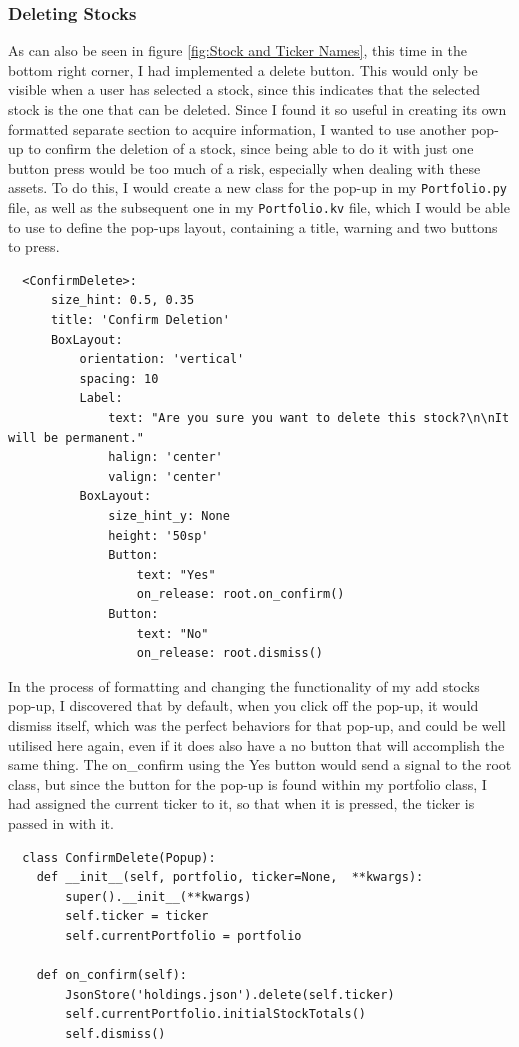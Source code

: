 \documentclass{article}
\begin{document}
\subsubsection{Deleting Stocks}
As can also be seen in figure \ref{fig:Stock and Ticker Names}, this time in the bottom right corner, I had implemented a delete button. This would only be visible when a user has selected a stock, since this indicates that the selected stock is the one that can be deleted. Since I found it so useful in creating its own formatted separate section to acquire information, I wanted to use another pop-up to confirm the deletion of a stock, since being able to do it with just one button press would be too much of a risk, especially when dealing with these assets. To do this, I would create a new class for the pop-up in my \texttt{Portfolio.py} file, as well as the subsequent one in my \texttt{Portfolio.kv} file, which I would be able to use to define the pop-ups layout, containing a title, warning and two buttons to press.\\\vspace{0.3cm}

\begin{verbatim}
  <ConfirmDelete>:
      size_hint: 0.5, 0.35
      title: 'Confirm Deletion'
      BoxLayout:
          orientation: 'vertical'
          spacing: 10
          Label:
              text: "Are you sure you want to delete this stock?\n\nIt will be permanent."
              halign: 'center'
              valign: 'center'
          BoxLayout:
              size_hint_y: None
              height: '50sp'
              Button:
                  text: "Yes"
                  on_release: root.on_confirm()
              Button:
                  text: "No"
                  on_release: root.dismiss()
\end{verbatim}

\vspace{0.3cm}
In the process of formatting and changing the functionality of my add stocks pop-up, I discovered that by default, when you click off the pop-up, it would dismiss itself, which was the perfect behaviors for that pop-up, and could be well utilised here again, even if it does also have a no button that will accomplish the same thing. The on\_confirm using the Yes button would send a signal to the root class, but since the button for the pop-up is found within my portfolio class, I had assigned the current ticker to it, so that when it is pressed, the ticker is passed in with it.

\begin{verbatim}
  class ConfirmDelete(Popup):
    def __init__(self, portfolio, ticker=None,  **kwargs):
        super().__init__(**kwargs)
        self.ticker = ticker
        self.currentPortfolio = portfolio

    def on_confirm(self):
        JsonStore('holdings.json').delete(self.ticker)
        self.currentPortfolio.initialStockTotals()
        self.dismiss()
\end{verbatim}
\end{document}
